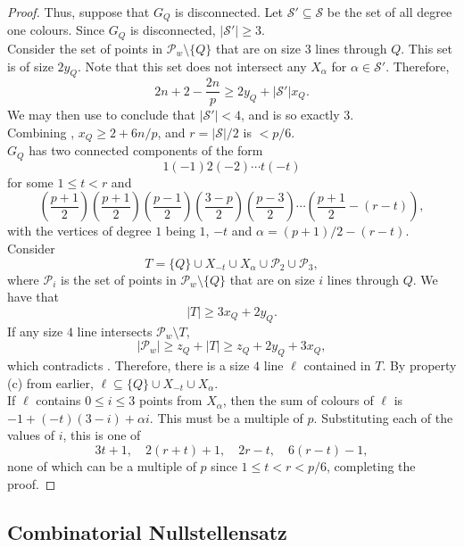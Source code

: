 \begin{proof}
		Thus, suppose that $G_Q$ is disconnected. Let $\mathcal{S}' \subseteq \mathcal{S}$ be the set of all degree one colours. Since $G_Q$ is disconnected, $|\mathcal{S}'| \ge 3$.\\
		Consider the set of points in $\mathcal{P}_w \setminus \{Q\}$ that are on size $3$ lines through $Q$. This set is of size $2y_Q$. Note that this set does not intersect any $X_\alpha$ for $\alpha \in \mathcal{S}'$. Therefore,
		\begin{equation}
			\label{eqn: xQ yQ joint bound 2}
			2n + 2 - \frac{2n}{p} \ge 2 y_Q + |\mathcal{S}'| x_Q.
		\end{equation}
		We may then use  to conclude that $|\mathcal{S}'| < 4$, and is so exactly $3$.\\
		Combining , $x_Q \ge 2 + 6n/p$, and $r = |\mathcal{S}|/2$ is $< p/6$.\\
		$G_Q$ has two connected components of the form
		\[ 1 (-1) 2 (-2) \cdots t (-t) \]
		for some $1 \le t < r$ and
		\[ \left( \frac{p+1}{2} \right) \left( \frac{p+1}{2} \right) \left( \frac{p-1}{2} \right) \left( \frac{3-p}{2} \right) \left( \frac{p-3}{2} \right) \cdots \left( \frac{p+1}{2} - (r-t) \right), \]
		with the vertices of degree $1$ being $1$, $-t$ and $\alpha = (p+1)/2 - (r-t)$. Consider
		\[ T = \{Q\} \cup X_{-t} \cup X_\alpha \cup \mathcal{P}_2 \cup \mathcal{P}_3, \]
		where $\mathcal{P}_i$ is the set of points in $\mathcal{P}_w \setminus \{Q\}$ that are on size $i$ lines through $Q$. We have that
		\[ |T| \ge 3x_Q + 2y_Q. \]
		If any size $4$ line intersects $\mathcal{P}_w \setminus T$,
		\[ |\mathcal{P}_w| \ge z_Q + |T| \ge z_Q + 2y_Q + 3x_Q, \]
		which contradicts . Therefore, there is a size $4$ line $\ell$ contained in $T$. By property (c) from earlier, $\ell \subseteq \{Q\} \cup X_{-t} \cup X_\alpha$.\\
		If $\ell$ contains $0 \le i \le 3$ points from $X_\alpha$, then the sum of colours of $\ell$ is $-1 + (-t)(3-i) + \alpha i$. This must be a multiple of $p$. Substituting each of the values of $i$, this is one of
		\[ 3t+1,\quad 2(r+t)+1,\quad 2r-t,\quad 6(r-t)-1, \]
		none of which can be a multiple of $p$ since $1 \le t < r < p/6$, completing the proof.
	\end{proof}

\subsection{Combinatorial Nullstellensatz}

